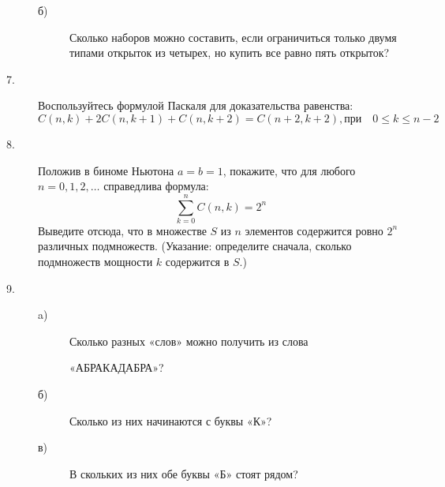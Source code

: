 \begin{description}
\begin{description}
\item[б)] Сколько наборов можно составить, 
если ограничиться только двумя типами открыток из четырех, 
но купить все равно пять открыток?
\end{description}
\item[7.] Воспользуйтесь формулой Паскаля для 
доказательства равенства:
\[
C(n, k) + 2 C(n, k+1) + C(n, k+2) = C(n+2, k+2), \text{при}
\quad 0 \leq k \leq n-2
\]
\item[8.] Положив в биноме Ньютона 
$a = b = 1$, покажите, что для любого 
$n = 0, 1, 2, \ldots$ справедлива формула:
\[
\sum_{k=0}^n C(n, k) = 2^n
\]
Выведите отсюда, что в множестве $S$ из $n$ 
элементов со­держится ровно $2^n$ различных подмножеств.
(Указание: определите сначала, сколько подмножеств мощ­ности 
$k$ содержится в $S$.)
\item[9.] \quad
\begin{description}
\item[a)] Сколько разных «слов» можно получить из слова
\begin{center}
«АБРАКАДАБРА»?
\end{center}
\item[б)] Сколько из них начинаются с буквы «К»?
\item[в)] В скольких из них обе буквы «Б» стоят рядом?
\end{description}
\end{description}